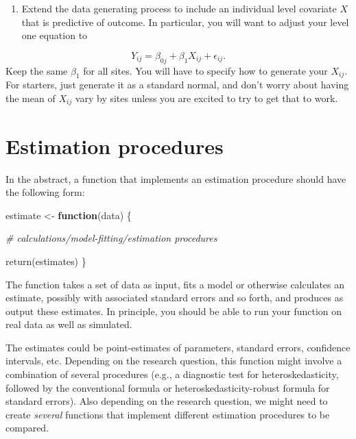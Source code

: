 \documentclass[
]{book}
\newenvironment{Shaded}{\begin{snugshade}}{\end{snugshade}}
\newcommand{\CommentTok}[1]{\textcolor[rgb]{0.56,0.35,0.01}{\textit{#1}}}
\newcommand{\ControlFlowTok}[1]{\textcolor[rgb]{0.13,0.29,0.53}{\textbf{#1}}}
\newcommand{\FunctionTok}[1]{\textcolor[rgb]{0.00,0.00,0.00}{#1}}
\newcommand{\NormalTok}[1]{#1}
\newcommand{\OtherTok}[1]{\textcolor[rgb]{0.56,0.35,0.01}{#1}}
\providecommand{\tightlist}{%
  \setlength{\itemsep}{0pt}\setlength{\parskip}{0pt}}
\begin{document}
\begin{enumerate}
\def\labelenumi{\arabic{enumi}.}
\setcounter{enumi}{5}
\tightlist
\item
  Extend the data generating process to include an individual level covariate \(X\) that is predictive of outcome. In particular, you will want to adjust your level one equation to
\end{enumerate}

\[ Y_{ij} = \beta_{0j} + \beta_{1} X_{ij} + \epsilon_{ij} . \]
Keep the same \(\beta_1\) for all sites.
You will have to specify how to generate your \(X_{ij}\).
For starters, just generate it as a standard normal, and don't worry about having the mean of \(X_{ij}\) vary by sites unless you are excited to try to get that to work.

\hypertarget{estimation-procedures}{%
\chapter{Estimation procedures}\label{estimation-procedures}}

In the abstract, a function that implements an estimation procedure should have the following form:

\begin{Shaded}
\begin{Highlighting}[]
\NormalTok{estimate }\OtherTok{\textless{}{-}} \ControlFlowTok{function}\NormalTok{(data) \{}

  \CommentTok{\# calculations/model{-}fitting/estimation procedures}
  
  \FunctionTok{return}\NormalTok{(estimates)}
\NormalTok{\}}
\end{Highlighting}
\end{Shaded}

The function takes a set of data as input, fits a model or otherwise calculates an estimate, possibly with associated standard errors and so forth, and produces as output these estimates.
In principle, you should be able to run your function on real data as well as simulated.

The estimates could be point-estimates of parameters, standard errors, confidence intervals, etc.
Depending on the research question, this function might involve a combination of several procedures (e.g., a diagnostic test for heteroskedasticity, followed by the conventional formula or heteroskedasticity-robust formula for standard errors).
Also depending on the research question, we might need to create \emph{several} functions that implement different estimation procedures to be compared.
\end{document}
